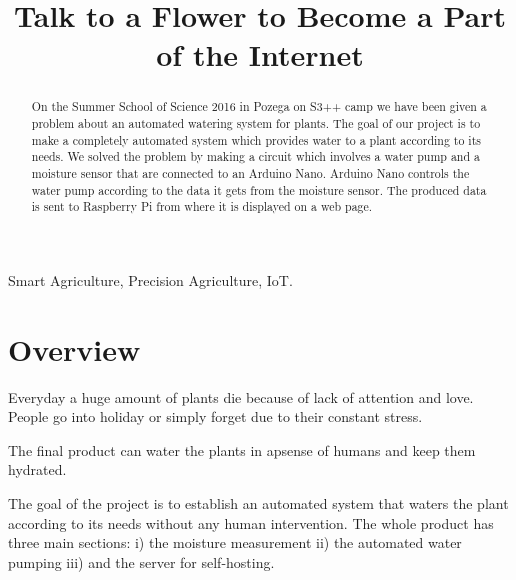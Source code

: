 \documentclass[conference]{IEEEtran}
\begin{document}
\title{Talk to a Flower to Become a Part of the Internet}

\author{
}

\maketitle

\begin{abstract}
On the Summer School of Science 2016 in Pozega on S3++ camp we have been given a problem about an automated watering system for plants.
The goal of our project is to make a completely automated system which provides water to a plant according to its needs.
We solved the problem by making a circuit which involves a water pump and a moisture sensor that are connected to an Arduino Nano.
Arduino Nano controls the water pump according to the data it gets from the moisture sensor.
The produced data is sent to Raspberry Pi from where it is displayed on a web page.
\end{abstract}

\begin{IEEEkeywords}
Smart Agriculture, Precision Agriculture, IoT.
\end{IEEEkeywords}

\IEEEpeerreviewmaketitle

\section{Overview}
\label{sec:overview}


Everyday a huge amount of plants die because of lack of attention and love.
People go into holiday or simply forget due to their constant stress.


The final product can water the plants in apsense of humans and keep them hydrated.


The goal of the project is to establish an automated system that waters the plant according to its needs without any human intervention.
The whole product has three main sections:
i) the moisture measurement
ii) the automated water pumping
iii) and the server for self-hosting.
\end{document}
